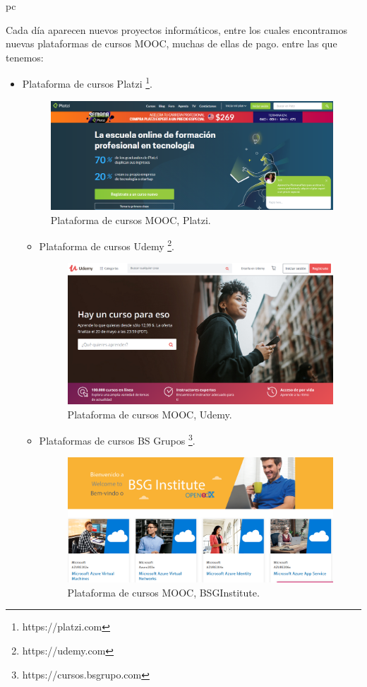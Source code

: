 pc\documentclass[a4paper,12pt,openany]{book}
\begin{document}
Cada día aparecen nuevos proyectos informáticos, entre los cuales encontramos nuevas plataformas de cursos MOOC, muchas de ellas de pago. entre las que tenemos:

\begin{itemize}
\item Plataforma de cursos Platzi \footnote{https://platzi.com}.

\begin{figure}[H]
  \centering
	\includegraphics[width=11cm]{Platzi.png}
\caption{Plataforma de cursos MOOC, Platzi.}
  \label{fig:Platzi}
\end{figure}

\begin{itemize}
\item Plataforma de cursos Udemy \footnote{https://udemy.com}.

\begin{figure}[H]
  \centering
	\includegraphics[width=11cm]{Udemy.png}
\caption{Plataforma de cursos MOOC, Udemy.}
  \label{fig:Udemy}
\end{figure}

\item Plataformas de cursos BS Grupos \footnote{https://cursos.bsgrupo.com}.

\begin{figure}[H]
  \centering
	\includegraphics[width=11cm]{BSGInstitute.png}
\caption{Plataforma de cursos MOOC, BSGInstitute.}
  \label{fig:BSG}
\end{figure}


\end{itemize}
\end{itemize}
\end{document}
